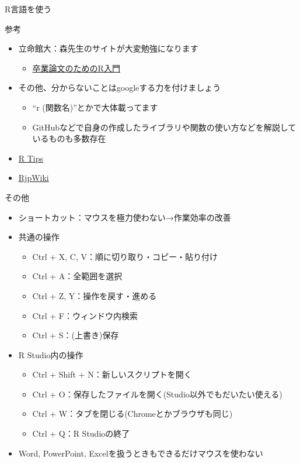 \documentclass[
  ignorenonframetext,
]{beamer}
\providecommand{\tightlist}{%
  \setlength{\itemsep}{0pt}\setlength{\parskip}{0pt}}
\begin{document}
\begin{frame}[fragile]{R言語を使う}
\begin{block}{参考}
\protect\hypertarget{ux53c2ux8003}{}
\begin{itemize}
\tightlist
\item
  立命館大：森先生のサイトが大変勉強になります

  \begin{itemize}
  \tightlist
  \item
    \href{https://tomoecon.github.io/R_for_graduate_thesis/}{卒業論文のためのR入門}
  \end{itemize}
\item
  その他、分からないことはgoogleする力を付けましょう

  \begin{itemize}
  \tightlist
  \item
    ``r (関数名)''とかで大体載ってます
  \item
    GitHubなどで自身の作成したライブラリや関数の使い方などを解説しているものも多数存在
  \end{itemize}
\item
  \href{http://cse.naro.affrc.go.jp/takezawa/r-tips/r.html}{R Tips}
\item
  \href{http://www.okadajp.org/RWiki/}{RjpWiki}
\end{itemize}
\end{block}

\begin{block}{その他}
\protect\hypertarget{ux305dux306eux4ed6}{}
\begin{itemize}
\tightlist
\item
  ショートカット：マウスを極力使わない→作業効率の改善
\item
  共通の操作

  \begin{itemize}
  \tightlist
  \item
    Ctrl + X, C, V：順に切り取り・コピー・貼り付け
  \item
    Ctrl + A：全範囲を選択
  \item
    Ctrl + Z, Y：操作を戻す・進める
  \item
    Ctrl + F：ウィンドウ内検索
  \item
    Ctrl + S：(上書き)保存
  \end{itemize}
\item
  R Studio内の操作

  \begin{itemize}
  \tightlist
  \item
    Ctrl + Shift + N：新しいスクリプトを開く
  \item
    Ctrl + O：保存したファイルを開く(Studio以外でもだいたい使える)
  \item
    Ctrl + W：タブを閉じる(Chromeとかブラウザも同じ)
  \item
    Ctrl + Q：R Studioの終了
  \end{itemize}
\item
  Word, PowerPoint, Excelを扱うときもできるだけマウスを使わない


\end{itemize}
\end{block}
\end{frame}
\end{document}
